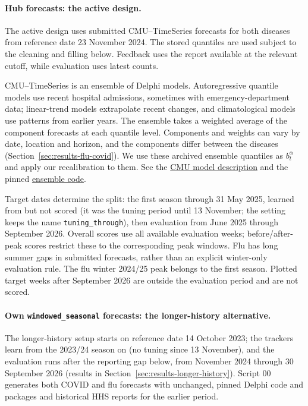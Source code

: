 \documentclass[11pt,a4paper]{article}
\theoremstyle{definition}
\theoremstyle{remark}
\begin{document}
\paragraph{Hub forecasts: the active design.}
The active design uses submitted CMU--TimeSeries
forecasts for both diseases from reference date 23 November 2024.
The stored quantiles are used subject to the cleaning and filling below. Feedback uses the report
available at the relevant cutoff, while evaluation uses latest counts.

CMU--TimeSeries is an ensemble of Delphi models. Autoregressive quantile
models use recent hospital admissions, sometimes with emergency-department
data; linear-trend models extrapolate recent changes, and climatological
models use patterns from earlier years. The ensemble takes a weighted
average of the component forecasts at each quantile level. Components
and weights can vary by date, location and horizon, and the components differ
between the diseases (Section~\ref{sec:results-flu-covid}). We use these archived
ensemble quantiles as $b_t^\alpha$ and apply our recalibration to them.
See the \href{https://github.com/cdcepi/FluSight-forecast-hub/blob/main/model-metadata/CMU-TimeSeries.yml}{CMU model description}
and the pinned \href{https://github.com/cmu-delphi/delphi-hub-forecasting/blob/9abebcfbcd4330aae5314fae51c5e8e5524675b5/R/ensemble_weights.R}{ensemble code}.

Target dates determine the split: the first season through 31 May 2025,
learned from but not scored (it was the tuning period until 13 November;
the setting keeps the name \texttt{tuning\_through}), then evaluation from
June 2025 through September 2026. Overall scores
use all available evaluation weeks; before/after-peak scores restrict
these to the corresponding peak windows. Flu has long summer gaps in
submitted forecasts, rather than an explicit winter-only evaluation rule.
The flu winter 2024/25 peak belongs to the first season. Plotted target weeks after
September 2026 are outside the evaluation period and are not scored.

\paragraph{Own \texttt{windowed\_\allowbreak seasonal} forecasts: the longer-history alternative.}
The longer-history setup starts on reference date 14 October 2023;
the trackers learn from the 2023/24 season on (no tuning since 13
November), and the evaluation runs after the reporting gap below, from
November 2024 through 30 September 2026 (results in
Section~\ref{sec:results-longer-history}).
Script 00 generates both COVID and flu forecasts with unchanged, pinned
Delphi code and packages and historical HHS reports for the earlier period.
\end{document}
